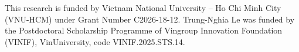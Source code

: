 \documentclass[runningheads]{llncs}
\newif\ifshowrevisions
\begin{document}
\begin{credits}
\ifsubmission
\else
\subsubsection{\ackname}
This research is funded by Vietnam National University -- Ho Chi Minh City (VNU-HCM) under Grant Number C2026-18-12. Trung-Nghia Le was funded by the Postdoctoral Scholarship Programme of Vingroup Innovation Foundation (VINIF), VinUniversity, code VINIF.2025.STS.14.
\fi
\end{credits}




%   
%   
%   
\end{document}
